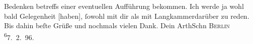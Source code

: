 \begin{ledgroupsized}[t]{13cm}
               Bedenken betreffs einer eventuellen Aufführung bekommen. Ich werde ja wohl bald
               Gelegenheit {[}haben{]}, ſowohl mit dir als mit Langkammerdarüber zu reden. Bis
               dahin beſte Grüße und nochmals vielen Dank.\pend
           \pstart Dein \spacefill\mbox{ArthSchn}\pend{}\pstart
           \textsc{Berlin}{ }\substVorne{}\textsuperscript{6}\substDazwischen{}7\substHinten{}. 2. 96.\pend
           
         
         \endnumbering{}\end{ledgroupsized}  \newcommand{\dateiname}{L00533}\newcommand{\titel}{Arthur Schnitzler an Hermann Bahr, 7. 2. 1896}\newcommand{\editorInnen}{ Kurt Ifkovits,  Martin Anton Müller}
      